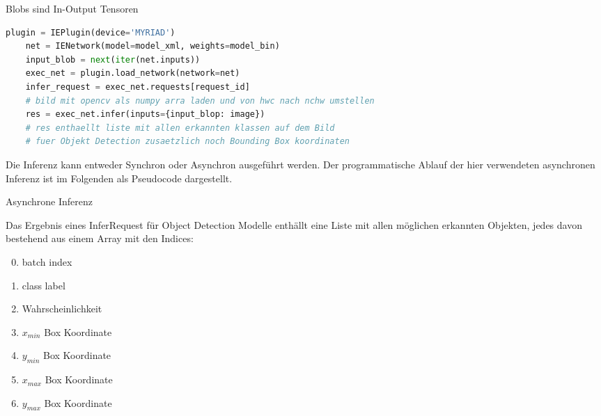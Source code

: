 \begin{figure}[htb]
    \centering
        
    \label{fig:diagramm}
\end{figure}


Blobs sind In-Output Tensoren


\begin{lstlisting}[language=Python]
    plugin = IEPlugin(device='MYRIAD')
    net = IENetwork(model=model_xml, weights=model_bin)
    input_blob = next(iter(net.inputs))
    exec_net = plugin.load_network(network=net)
    infer_request = exec_net.requests[request_id]
    # bild mit opencv als numpy arra laden und von hwc nach nchw umstellen
    res = exec_net.infer(inputs={input_blop: image})
    # res enthaellt liste mit allen erkannten klassen auf dem Bild
    # fuer Objekt Detection zusaetzlich noch Bounding Box koordinaten
\end{lstlisting}


Die Inferenz kann entweder Synchron oder Asynchron ausgeführt 
werden. Der programmatische Ablauf der hier verwendeten 
asynchronen Inferenz ist im Folgenden als Pseudocode dargestellt.




\begin{algorithm}[H]
    \caption{Asynchrone Inferenz}
\end{algorithm}


Das Ergebnis eines InferRequest für Object Detection Modelle 
enthällt eine Liste mit allen möglichen erkannten Objekten, jedes 
davon bestehend aus einem Array mit den Indices:

\begin{enumerate}
    \setcounter{enumi}{-1}
    \item batch index
    \item class label
    \item Wahrscheinlichkeit
    \item $x_{min}$ Box Koordinate
    \item $y_{min}$ Box Koordinate
    \item $x_{max}$ Box Koordinate
    \item $y_{max}$ Box Koordinate
\end{enumerate}

